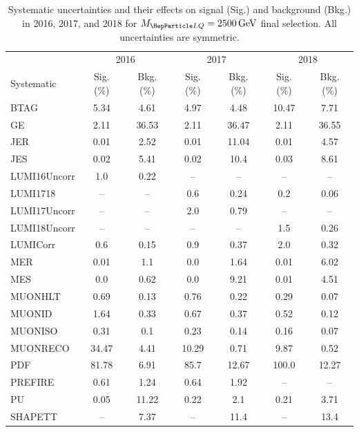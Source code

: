 \begin{table}[H]
	\begin{center}
        \begin{footnotesize}
			\caption{Systematic uncertainties and their effects on signal (Sig.) and background (Bkg.) in 2016, 2017, and 2018 for $\MLQ = \SI{2500}{GeV}$ final selection. All uncertainties are symmetric.}
			\begin{tabular}{lcccccc} \hline \hline
				& \multicolumn{2}{c}{2016} & \multicolumn{2}{c}{2017} & \multicolumn{2}{c}{2018} \\
				Systematic & Sig. (\%) & Bkg. (\%) & Sig. (\%) & Bkg. (\%) & Sig. (\%) & Bkg. (\%) \\ \hline
				BTAG &  5.34  &  4.61 &  4.97  &  4.48 &  10.47  &  7.71 \\
				GE &  2.11  &  36.53 &  2.11  &  36.47 &  2.11  &  36.55 \\
				JER &  0.01  &  2.52 &  0.01  &  11.04 &  0.01  &  4.57 \\
				JES &  0.02  &  5.41 &  0.02  &  10.4 &  0.03  &  8.61 \\
				LUMI16Uncorr &  1.0  &  0.22 & -- & -- & -- & -- \\
				LUMI1718 & -- & -- &  0.6  &  0.24 &  0.2  &  0.06 \\
				LUMI17Uncorr & -- & -- &  2.0  &  0.79 & -- & -- \\
				LUMI18Uncorr & -- & -- & -- & -- &  1.5  &  0.26 \\
				LUMICorr &  0.6  &  0.15 &  0.9  &  0.37 &  2.0  &  0.32 \\
				MER &  0.01  &  1.1 &  0.0  &  1.64 &  0.01  &  6.02 \\
				MES &  0.0  &  0.62 &  0.0  &  9.21 &  0.01  &  4.51 \\
				MUONHLT &  0.69  &  0.13 &  0.76  &  0.22 &  0.29  &  0.07 \\
				MUONID &  1.64  &  0.33 &  0.67  &  0.37 &  0.52  &  0.12 \\
				MUONISO &  0.31  &  0.1 &  0.23  &  0.14 &  0.16  &  0.07 \\
				MUONRECO &  34.47  &  4.41 &  10.29  &  0.71 &  9.87  &  0.52 \\
				PDF &  81.78  &  6.91 &  85.7  &  12.67 &  100.0  &  12.27 \\
				PREFIRE &  0.61  &  1.24 &  0.64  &  1.92 & -- & -- \\
				PU &  0.05  &  11.22 &  0.22  &  2.1 &  0.21  &  3.71 \\
				SHAPETT & -- &  7.37 & -- &  11.4 & -- &  13.4 \\

\end{tabular}
\end{footnotesize}
\end{center}
\end{table}

